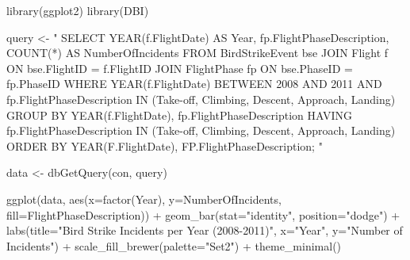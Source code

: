 \documentclass[
]{article}
\newenvironment{Shaded}{\begin{snugshade}}{\end{snugshade}}
\newcommand{\AttributeTok}[1]{\textcolor[rgb]{0.77,0.63,0.00}{#1}}
\newcommand{\FunctionTok}[1]{\textcolor[rgb]{0.00,0.00,0.00}{#1}}
\newcommand{\NormalTok}[1]{#1}
\newcommand{\OtherTok}[1]{\textcolor[rgb]{0.56,0.35,0.01}{#1}}
\newcommand{\SpecialCharTok}[1]{\textcolor[rgb]{0.00,0.00,0.00}{#1}}
\newcommand{\StringTok}[1]{\textcolor[rgb]{0.31,0.60,0.02}{#1}}
\begin{document}
\begin{Shaded}
\begin{Highlighting}[]
\FunctionTok{library}\NormalTok{(ggplot2)}
\FunctionTok{library}\NormalTok{(DBI)}

\NormalTok{query }\OtherTok{\textless{}{-}} \StringTok{"}
\StringTok{SELECT }
\StringTok{    YEAR(f.FlightDate) AS Year,}
\StringTok{    fp.FlightPhaseDescription,}
\StringTok{    COUNT(*) AS NumberOfIncidents}
\StringTok{FROM }
\StringTok{    BirdStrikeEvent bse}
\StringTok{JOIN }
\StringTok{    Flight f ON bse.FlightID = f.FlightID}
\StringTok{JOIN }
\StringTok{    FlightPhase fp ON bse.PhaseID = fp.PhaseID}
\StringTok{WHERE }
\StringTok{    YEAR(f.FlightDate) BETWEEN 2008 AND 2011}
\StringTok{    AND fp.FlightPhaseDescription IN (\textquotesingle{}Take{-}off\textquotesingle{}, \textquotesingle{}Climbing\textquotesingle{}, \textquotesingle{}Descent\textquotesingle{}, \textquotesingle{}Approach\textquotesingle{}, \textquotesingle{}Landing\textquotesingle{})}
\StringTok{GROUP BY }
\StringTok{    YEAR(f.FlightDate),}
\StringTok{    fp.FlightPhaseDescription}
\StringTok{HAVING }
\StringTok{    fp.FlightPhaseDescription IN (\textquotesingle{}Take{-}off\textquotesingle{}, \textquotesingle{}Climbing\textquotesingle{}, \textquotesingle{}Descent\textquotesingle{}, \textquotesingle{}Approach\textquotesingle{}, \textquotesingle{}Landing\textquotesingle{})}
\StringTok{ORDER BY }
\StringTok{    YEAR(F.FlightDate), FP.FlightPhaseDescription;}
\StringTok{"}

\NormalTok{data }\OtherTok{\textless{}{-}} \FunctionTok{dbGetQuery}\NormalTok{(con, query)}

\FunctionTok{ggplot}\NormalTok{(data, }\FunctionTok{aes}\NormalTok{(}\AttributeTok{x=}\FunctionTok{factor}\NormalTok{(Year), }\AttributeTok{y=}\NormalTok{NumberOfIncidents, }\AttributeTok{fill=}\NormalTok{FlightPhaseDescription)) }\SpecialCharTok{+} 
  \FunctionTok{geom\_bar}\NormalTok{(}\AttributeTok{stat=}\StringTok{"identity"}\NormalTok{, }\AttributeTok{position=}\StringTok{"dodge"}\NormalTok{) }\SpecialCharTok{+}
  \FunctionTok{labs}\NormalTok{(}\AttributeTok{title=}\StringTok{"Bird Strike Incidents per Year (2008{-}2011)"}\NormalTok{, }
       \AttributeTok{x=}\StringTok{"Year"}\NormalTok{, }
       \AttributeTok{y=}\StringTok{"Number of Incidents"}\NormalTok{) }\SpecialCharTok{+}
  \FunctionTok{scale\_fill\_brewer}\NormalTok{(}\AttributeTok{palette=}\StringTok{"Set2"}\NormalTok{) }\SpecialCharTok{+}
  \FunctionTok{theme\_minimal}\NormalTok{()}
\end{Highlighting}
\end{Shaded}
\end{document}
